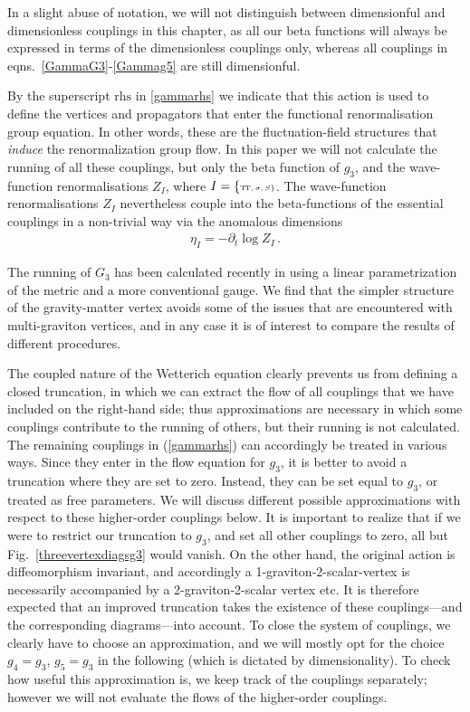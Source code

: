 \documentclass[11pt]{book} %
\newcommand\TTspace{ -1pt }
\newcommand\TT{ \scriptscriptstyle{\mathrm{T\hspace{\TTspace}T}} }
\numberwithin{equation}{chapter}
\begin{document}
In a slight abuse of notation, we will not distinguish between dimensionful and dimensionless couplings in
this chapter,
as all our beta functions will always be expressed in terms of the dimensionless couplings only,
whereas all couplings in eqns.~\eqref{GammaG3}-\eqref{Gammag5} are still dimensionful.

By the superscript $\mathrm{rhs}$ in \eqref{gammarhs} we indicate that this action is used to define the
vertices and propagators that enter the functional renormalisation group equation.
In other words, these are the fluctuation-field structures that \emph{induce} the renormalization group flow.
In this paper we will not calculate the running of all these couplings, but only the beta function
of $g_3$, and the wave-function renormalisations $Z_I$, where $I = \{ \TT, \, \sigma, \, S \}$.
The wave-function renormalisations $Z_I$ nevertheless couple into the beta-functions of the
essential couplings in a non-trivial way via the anomalous dimensions
\begin{align}
  \eta_I = -\partial_t \log Z_I \,.
\end{align}

The running of $G_3$ has been calculated recently in \cite{Meibohm:2015twa} using a linear
parametrization of the metric and a more conventional gauge.
We find that the simpler structure of the gravity-matter vertex avoids some of the issues that
are encountered with multi-graviton vertices,
and in any case it is of interest to compare the results of different procedures.

The coupled nature of the Wetterich equation clearly prevents us from defining a closed truncation,
in which we can extract the flow of all couplings that we have included on the right-hand side;
thus approximations are necessary in which some couplings contribute to the running of others,
but their running is not calculated.
The remaining couplings in (\ref{gammarhs}) can accordingly be treated in various ways.
Since they enter in the flow equation for $g_3$,
it is better to avoid a truncation where they are set to zero.
Instead, they can be set equal to $g_3$, or treated as free parameters.
We will discuss different possible approximations with respect to these higher-order couplings below.
It is important to realize that if we were to restrict our truncation to $g_3$,
and set all other couplings to zero, all but Fig.~\ref{threevertexdiagsg3} would vanish.
On the other hand, the original action is diffeomorphism invariant,
and accordingly a 1-graviton-2-scalar-vertex is necessarily accompanied by a 2-graviton-2-scalar vertex etc.
It is therefore expected that an improved truncation takes the existence of these couplings---and
the corresponding diagrams---into account.
To close the system of couplings, we clearly have to choose an approximation,
and we will mostly opt for the choice $g_4=g_3$, $g_5=g_3$ in the following
(which is dictated by dimensionality). To check how useful this approximation is,
we keep track of the couplings separately;
however we will not evaluate the flows of the higher-order couplings.
\end{document}
